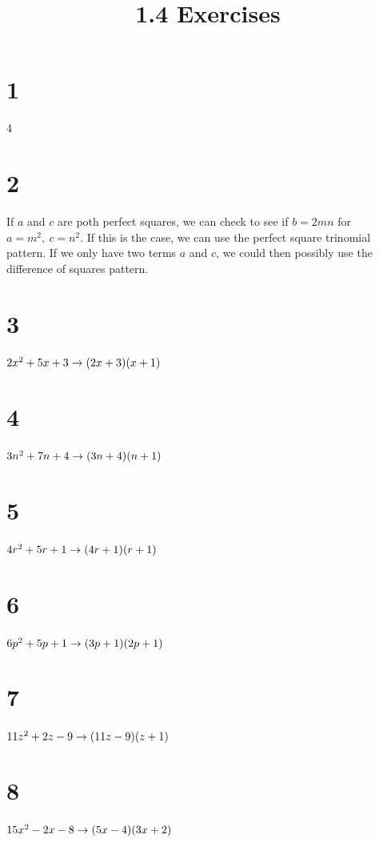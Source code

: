\documentclass{article}
\title{1.4 Exercises}
\theoremstyle{definition}
\begin{document}
\maketitle

\section*{1}
$4$

\section*{2}
If $a$ and $c$ are poth perfect squares, we can check to see if $b=2mn$ for $a=m^2,\ c=n^2$. If this is the case, we can use the perfect square trinomial 
pattern. If we only have two terms $a$ and $c$, we could then possibly use the difference of squares pattern.

\section*{3}
$2x^2+5x+3\newline\rightarrow (2x+3)(x+1)$

\section*{4}
$3n^2+7n+4\newline\rightarrow (3n+4)(n+1)$

\section*{5}
$4r^2+5r+1\newline\rightarrow (4r+1)(r+1)$

\section*{6}
$6p^2+5p+1\newline\rightarrow (3p+1)(2p+1)$

\section*{7}
$11z^2+2z-9\newline\rightarrow (11z-9)(z+1)$

\section*{8}
$15x^2-2x-8\newline\rightarrow (5x-4)(3x+2)$
\end{document}
